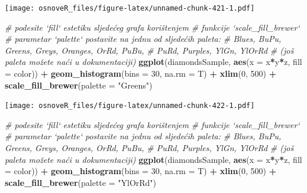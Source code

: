 \documentclass[]{book}
\newenvironment{Shaded}{\begin{snugshade}}{\end{snugshade}}
\newcommand{\KeywordTok}[1]{\textcolor[rgb]{0.13,0.29,0.53}{\textbf{#1}}}
\newcommand{\DataTypeTok}[1]{\textcolor[rgb]{0.13,0.29,0.53}{#1}}
\newcommand{\DecValTok}[1]{\textcolor[rgb]{0.00,0.00,0.81}{#1}}
\newcommand{\StringTok}[1]{\textcolor[rgb]{0.31,0.60,0.02}{#1}}
\newcommand{\CommentTok}[1]{\textcolor[rgb]{0.56,0.35,0.01}{\textit{#1}}}
\newcommand{\OperatorTok}[1]{\textcolor[rgb]{0.81,0.36,0.00}{\textbf{#1}}}
\newcommand{\NormalTok}[1]{#1}
\theoremstyle{definition}
\theoremstyle{definition}
\theoremstyle{definition}
\theoremstyle{remark}
\begin{document}
\texttt{[image: osnoveR\_files/figure-latex/unnamed-chunk-421-1.pdf]}

\begin{Shaded}
\begin{Highlighting}[]
\CommentTok{# podesite `fill` estetiku sljedećeg grafa korištenjem }
\CommentTok{# funkcije `scale_fill_brewer`}
\CommentTok{# parametar `palette` postavite na jednu od sljedećih paleta:}
\CommentTok{# Blues, BuPu, Greens, Greys, Oranges, OrRd, PuBu, }
\CommentTok{#      PuRd, Purples, YlGn, YlOrRd}
\CommentTok{# (još paleta možete naći u dokumentaciji)}
\KeywordTok{ggplot}\NormalTok{(diamondsSample, }\KeywordTok{aes}\NormalTok{(}\DataTypeTok{x =}\NormalTok{ x}\OperatorTok{*}\NormalTok{y}\OperatorTok{*}\NormalTok{z, }\DataTypeTok{fill =}\NormalTok{ color)) }\OperatorTok{+}\StringTok{ }
\StringTok{  }\KeywordTok{geom_histogram}\NormalTok{(}\DataTypeTok{bins =} \DecValTok{30}\NormalTok{, }\DataTypeTok{na.rm =}\NormalTok{ T) }\OperatorTok{+}\StringTok{ }
\StringTok{  }\KeywordTok{xlim}\NormalTok{(}\DecValTok{0}\NormalTok{, }\DecValTok{500}\NormalTok{) }\OperatorTok{+}\StringTok{ }\KeywordTok{scale_fill_brewer}\NormalTok{(}\DataTypeTok{palette =} \StringTok{"Greens"}\NormalTok{)}
\end{Highlighting}
\end{Shaded}

\texttt{[image: osnoveR\_files/figure-latex/unnamed-chunk-422-1.pdf]}

\begin{Shaded}
\begin{Highlighting}[]
\CommentTok{# podesite `fill` estetiku sljedećeg grafa korištenjem }
\CommentTok{# funkcije `scale_fill_brewer`}
\CommentTok{# parametar `palette` postavite na jednu od sljedećih paleta:}
\CommentTok{# Blues, BuPu, Greens, Greys, Oranges, OrRd, PuBu, }
\CommentTok{#   PuRd, Purples, YlGn, YlOrRd}
\CommentTok{# (još paleta možete naći u dokumentaciji)}
\KeywordTok{ggplot}\NormalTok{(diamondsSample, }\KeywordTok{aes}\NormalTok{(}\DataTypeTok{x =}\NormalTok{ x}\OperatorTok{*}\NormalTok{y}\OperatorTok{*}\NormalTok{z, }\DataTypeTok{fill =}\NormalTok{ color)) }\OperatorTok{+}\StringTok{ }
\StringTok{  }\KeywordTok{geom_histogram}\NormalTok{(}\DataTypeTok{bins =} \DecValTok{30}\NormalTok{, }\DataTypeTok{na.rm =}\NormalTok{ T) }\OperatorTok{+}\StringTok{ }
\StringTok{  }\KeywordTok{xlim}\NormalTok{(}\DecValTok{0}\NormalTok{, }\DecValTok{500}\NormalTok{) }\OperatorTok{+}\StringTok{ }\KeywordTok{scale_fill_brewer}\NormalTok{(}\DataTypeTok{palette =} \StringTok{"YlOrRd"}\NormalTok{)}
\end{Highlighting}
\end{Shaded}
\end{document}
